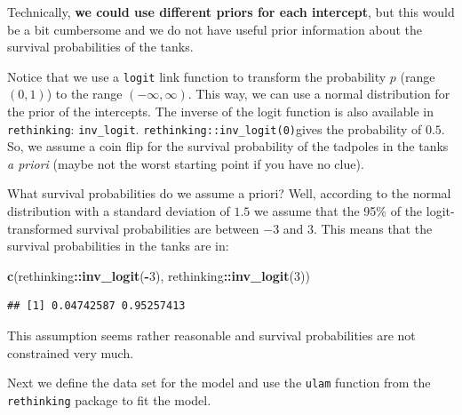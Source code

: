 \documentclass[
]{book}
\newenvironment{Shaded}{\begin{snugshade}}{\end{snugshade}}
\newcommand{\DecValTok}[1]{\textcolor[rgb]{0.00,0.00,0.81}{#1}}
\newcommand{\FunctionTok}[1]{\textcolor[rgb]{0.13,0.29,0.53}{\textbf{#1}}}
\newcommand{\NormalTok}[1]{#1}
\newcommand{\SpecialCharTok}[1]{\textcolor[rgb]{0.81,0.36,0.00}{\textbf{#1}}}
\begin{document}
Technically, \textbf{we could use different priors for each intercept},
but this would be a bit cumbersome and we do not have useful prior information
about the survival probabilities of the tanks.

Notice that we use a \texttt{logit} link function to transform the probability \(p\) (range \((0,1)\))
to the range \((-\infty, \infty)\).
This way, we can use a normal distribution for the prior of the intercepts.
The inverse of the logit function is also available in \texttt{rethinking}: \texttt{inv\_logit}.
\texttt{rethinking::inv\_logit(0)}gives the probability of \(0.5\). So, we assume a coin flip for
the survival probability of the tadpoles in the tanks \emph{a priori}
(maybe not the worst starting point if you have no clue).

What survival probabilities do we assume a priori? Well, according to
the normal distribution with a standard deviation of \(1.5\) we assume that the
95\% of the logit-transformed survival probabilities are between \(-3\) and \(3\).
This means that the survival probabilities in the tanks are in:

\begin{Shaded}
\begin{Highlighting}[]
\FunctionTok{c}\NormalTok{(rethinking}\SpecialCharTok{::}\FunctionTok{inv\_logit}\NormalTok{(}\SpecialCharTok{{-}}\DecValTok{3}\NormalTok{), rethinking}\SpecialCharTok{::}\FunctionTok{inv\_logit}\NormalTok{(}\DecValTok{3}\NormalTok{))}
\end{Highlighting}
\end{Shaded}

\begin{verbatim}
## [1] 0.04742587 0.95257413
\end{verbatim}

This assumption seems rather reasonable and survival probabilities are not constrained very much.

Next we define the data set for the model and use the \texttt{ulam} function
from the \texttt{rethinking} package to fit the model.
\end{document}

